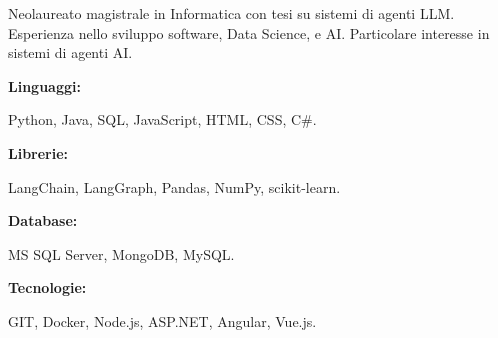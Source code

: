 \documentclass[9pt]{developercv} %
\begin{document}
\begin{minipage}[t]{0.46\textwidth}
	\vspace{-6pt}

    Neolaureato magistrale in Informatica con tesi su sistemi di agenti LLM. Esperienza nello sviluppo software, Data Science, e AI. Particolare interesse in sistemi di agenti AI.\\
\end{minipage}
\hfill %
\begin{minipage}[t]{0.465\textwidth}
    \vspace{-6pt}

    \begin{minipage}[t]{0.2\textwidth}
        \textbf{Linguaggi:}
    \end{minipage}
    \hfill
    \begin{minipage}[t]{0.73\textwidth}
      Python, Java, SQL, JavaScript, HTML, CSS, C\#.
    \end{minipage}
    \vspace{4mm}

    \begin{minipage}[t]{0.2\textwidth}
        \textbf{Librerie:}
    \end{minipage}
    \hfill
    \begin{minipage}[t]{0.73\textwidth}
      LangChain, LangGraph, Pandas, NumPy, scikit-learn.
    \end{minipage}
    \vspace{4mm}

    \begin{minipage}[t]{0.2\textwidth}
        \textbf{Database:}
    \end{minipage}
    \hfill
    \begin{minipage}[t]{0.73\textwidth}
      MS SQL Server, MongoDB, MySQL.
    \end{minipage}
    \vspace{4mm}

    \begin{minipage}[t]{0.2\textwidth}
        \textbf{Tecnologie:}
    \end{minipage}
    \hfill
    \begin{minipage}[t]{0.73\textwidth}
      GIT, Docker, Node.js, ASP.NET, Angular, Vue.js.
    \end{minipage}

\end{minipage}
\end{document}
